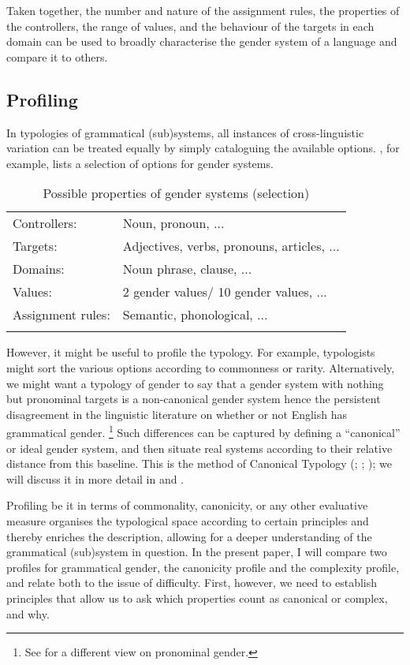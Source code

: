 \documentclass[output=collectionpaper]{langsci/langscibook}
\begin{document}
Taken together, the number and nature of the assignment rules, the properties of the controllers, the range of values, and the behaviour of the targets in each domain can be used to broadly characterise the gender system of a language and compare it to others.


\subsection{Profiling}

In typologies of grammatical (sub)systems, all instances of cross-linguistic variation can be treated equally by simply cataloguing the available options. , for example, lists a selection of options for gender systems.

\begin{table}[htb]
\begin{tabular}{ll}
\lsptoprule
Controllers: & Noun, pronoun, ...\\
Targets: & Adjectives, verbs, pronouns, articles, ...\\
Domains: & Noun phrase, clause, ...\\
Values: & 2 gender values/ 10 gender values, ...\\
Assignment rules: & Semantic, phonological, ...\\
\lspbottomrule
\end{tabular}
\caption{Possible properties of gender systems (selection)}
\label{tab:Audr:Props}
\end{table}

However, it might be useful to profile the typology. For example, typologists might sort the various options according to commonness or rarity. Alternatively, we might want a typology of gender to say that a gender system with nothing but pronominal targets is a non-canonical gender system \textendash{} hence the persistent disagreement in the linguistic literature on whether or not English has grammatical gender.%
\footnote{See  for a different view on pronominal gender.} %
Such differences can be captured by defining a ``canonical'' or ideal gender system, and then situate real systems according to their relative distance from this baseline. This is the method of Canonical Typology (\citealt{Corbett2006,Corbett2012}; \citealt{Brown2013}; \citealt{Corbett2016}); we will discuss it in more detail in  and .

Profiling \textendash{} be it in terms of commonality, canonicity, or any other evaluative measure \textendash{} organises the typological space according to certain principles and thereby enriches the description, allowing for a deeper understanding of the grammatical (sub)system in question. In the present paper, I will compare two profiles for grammatical gender, the canonicity profile and the complexity profile, and relate both to the issue of difficulty. First, however, we need to establish principles that allow us to ask which properties count as canonical or complex, and why.
\end{document}
